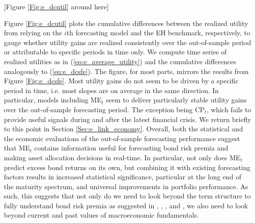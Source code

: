 \documentclass[12pt,letterpaper,leqno,doublespacing]{article}
\begin{document}
\begin{center}
    [Figure \ref{Fig:e_dcutil} around here]
\end{center}

Figure \ref{Fig:e_dcutil} plots the cumulative differences between the realized utility from relying on the $i$th forecasting model and the EH benchmark, respectively, to gauge whether utility gains are realized consistently over the out-of-sample period or attributable to specific periods in time only. We compute time series of realized utilities as in (\ref{eq:e_average_utility}) and the cumulative differences analogously to (\ref{eq:e_dcsfe}). The figure, for most parts, mirrors the results from Figure \ref{Fig:e_dcsfe}. Most utility gains do not seem to be driven by a specific period in time, i.e. most slopes are on average in the same direction. In particular, models including ME$_{t}$ seem to deliver particularly stable utility gains over the out-of-sample forecasting period. The exception being CP$_{t}$, which fails to provide useful signals during and after the latest financial crisis. We return briefly to this point in Section \ref{Sec:e_link_economy}. Overall, both the statistical and the economic evaluations of the out-of-sample forecasting performance suggest that ME$_{t}$ contains information useful for forecasting bond risk premia and making asset allocation decisions in real-time. In particular, not only does ME$_{t}$ predict excess bond returns on its own, but combining it with existing forecasting factors results in increased statistical significance, particular at the long end of the maturity spectrum, and universal improvements in portfolio performance. As such, this suggests that not only do we need to look beyond the term structure to fully understand bond risk premia as suggested in \cite{LudvigsonNg2009}, \cite{CooperPriestley2009}, \cite{Duffee2011}, and \cite{JoslinPriebschSingleton2014}, we also need to look beyond current and past values of macroeconomic fundamentals. 

\end{document}
